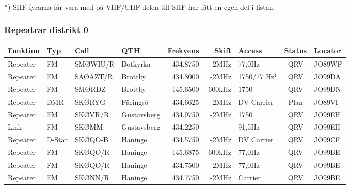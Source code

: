 *) SHF-fyrarna får vara med på VHF/UHF-delen till SHF har fått en egen del i listan.

\clearpage


\subsubsection{Repeatrar distrikt 0}
\begin{longtable}{llllrrlcl}
	\textbf{Funktion}  & \textbf{Typ} & \textbf{Call} & \textbf{QTH} & \textbf{Frekvens} & \textbf{Skift} & \textbf{Access} & \textbf{Status} & \textbf{Locator} \\ \hline
	\endhead

Repeater & FM           & SMØWIU/R      & Botkyrka     &          434.8750 &          -2MHz & 77,0Hz          &       QRV       & JO89WF           \\
	Repeater           & FM           & SAØAZT/R      & Brottby      &          434.8000 &          -2MHz & 1750/77 Hz$^1$  &       QRV       & JO99DA           \\
	Repeater           & FM           & SMØRDZ        & Brottby      &          145.6500 &        -600kHz & 1750            &       QRV       & JO99DN           \\
	Repeater           & DMR          & SKØRYG        & Färingsö     &          434.6625 &          -2MHz & DV Carrier      &      Plan       & JO89VI           \\
	Repeater           & FM           & SKØVR/R       & Gustavsberg  &          434.9750 &          -2MHz & 1750            &       QRV       & JO99EH           \\
	Link               & FM           & SKØMM         & Gustavsberg  &          434.2250 &                & 91,5Hz          &       QRV       & JO99EH           \\
	Repeater           & D-Star       & SKØQO-B       & Haninge      &          434.5750 &          -2MHz & DV Carrier      &       QRV       & JO99CF           \\
	Repeater           & FM           & SKØQO/R       & Haninge      &          145.6875 &        -600kHz & 77,0Hz          &       QRV       & JO99BE           \\
	Repeater           & FM           & SKØQO/R       & Haninge      &          434.7500 &          -2MHz & 77,0Hz          &       QRV       & JO99BE           \\
	Repeater           & FM           & SKØNN/R       & Haninge      &          434.7750 &          -2MHz & Carrier         &       QRV       & JO99BE           \\

\end{longtable}
